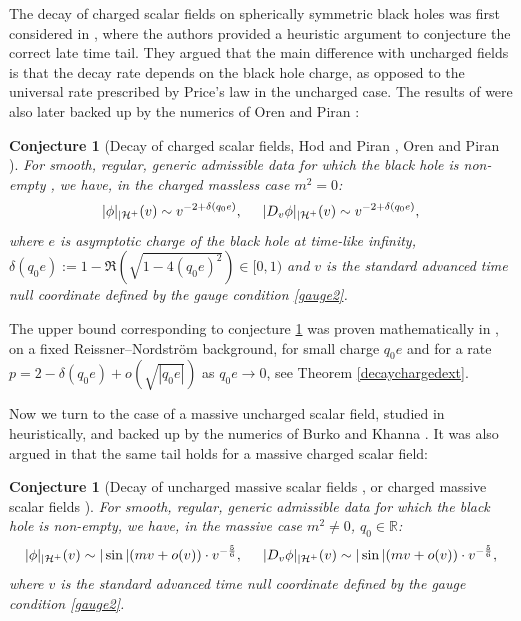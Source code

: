 \documentclass[10pt,a4paper]{article}
\theoremstyle{plain}
\newtheorem{conjecture}[thm]{Conjecture}
\theoremstyle{remark}
\theoremstyle{definition}
\newcommand{\RR}{\mathbb{R}}
\theoremstyle{plain}
\theoremstyle{remark}
\theoremstyle{definition}
\numberwithin{equation}{section}
\begin{document}
The decay of charged scalar fields on spherically symmetric black holes was first considered in \cite{HodPiran1}, where the authors provided a heuristic argument to conjecture the correct late time tail. They argued that the main difference with uncharged fields is that the decay rate depends on the black hole charge, as opposed to the universal rate prescribed by Price's law in the uncharged case. The results of \cite{HodPiran1} were also later backed up by the numerics of Oren and Piran \cite{OrenPiran}:
\begin{conjecture} [Decay of charged scalar fields, Hod and Piran \cite{HodPiran1}, Oren and Piran \cite{OrenPiran}] \label{chargedconj} For smooth, regular, generic admissible data for which the black hole is non-empty , we have, in the charged massless case $m^2=0$:
	$$ |\phi|_{|\mathcal{H}^+}(v) \sim v^{-2+\delta(q_0e)}, \hskip 5 mm |D_v \phi|_{|\mathcal{H}^+}(v) \sim v^{-2+\delta(q_0e)},$$ where $e$ is asymptotic charge of the black hole at time-like infinity, $\delta(q_0e):= 1-\Re(\sqrt{1-4(q_0e)^2}) \in [0,1)$ and $v$ is the standard advanced time null coordinate defined by the gauge condition \eqref{gauge2}.
\end{conjecture}

The upper bound corresponding to conjecture \ref{chargedconj} was proven mathematically in \cite{Moi2}, on a fixed Reissner--Nordstr\"{o}m background, for small charge $q_0e$ and for a rate $p= 2-\delta(q_0e)+o( \sqrt{|q_0e|})$ as $q_0e \rightarrow 0$, see Theorem \ref{decaychargedext}.

Now we turn to the case of a massive uncharged scalar field, studied in \cite{KoyamaTomimatsu} heuristically, and backed up by the numerics of Burko and Khanna \cite{BurkoKhanna}. It was also argued in \cite{KonoplyaZhidenko} that the same tail holds for a massive charged scalar field:

\begin{conjecture} [Decay of uncharged massive scalar fields \cite{BurkoKhanna}, \cite{KoyamaTomimatsu} or charged massive scalar fields \cite{KonoplyaZhidenko}] \label{conjecturemassive} For smooth, regular, generic admissible data for which the black hole is non-empty, we have, in the massive  case $m^2 \neq 0$, $q_0 \in \RR$: %
	$$ |\phi|_{|\mathcal{H}^+}(v) \sim |\sin|( mv + o(v) )\cdot v^{-\frac{5}{6}}, \hskip 5 mm |D_v \phi|_{|\mathcal{H}^+}(v) \sim |\sin|( mv + o(v) )\cdot v^{-\frac{5}{6}},$$ where $v$ is the standard advanced time null coordinate defined by the gauge condition \eqref{gauge2}.
\end{conjecture}
\end{document}
